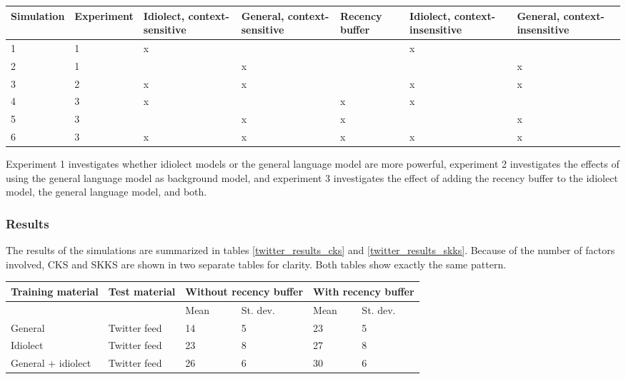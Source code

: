 \documentclass[12pt]{article}
\let\originaltable\table
\let\endoriginaltable\endtable
\renewenvironment{table}[1][ht]{%
  \originaltable[#1]
  \centering}%
  {\endoriginaltable}
\begin{document}
\begin{table}[H] \footnotesize
\begin{tabular}{l|l|p{1.2cm}p{1.2cm}p{1.2cm}p{1.2cm}p{1.2cm}} 
Simulation&Experiment&Idiolect, context-sensitive&General, context-sensitive&Recency buffer&Idiolect, context-insensitive&General, context-insensitive\\
\hline
1&1&x&&&x&\\
2&1&&x&&&x\\

3&2&x&x&&x&x\\

4&3&x&&x&x&\\
5&3&&x&x&&x\\
6&3&x&x&x&x&x\\

\end{tabular} 
\caption{Overview of all module set-ups} 
\end{table}

Experiment 1 investigates whether idiolect models or the general language model are more powerful, experiment 2 investigates the effects of using the general language model as background model, and experiment 3 investigates the effect of adding the recency buffer to the idiolect model, the general language model, and both.

\subsubsection{Results}

The results of the simulations are summarized in tables \ref{twitter_results_cks} and \ref{twitter_results_skks}. Because of the number of factors involved, CKS and SKKS are shown in two separate tables for clarity. Both tables show exactly the same pattern.

\begin{table}[H] 
\centering
\begin{tabular}{ll|llll} 
Training material&Test material&\multicolumn{2}{l}{Without recency buffer}&\multicolumn{2}{l}{With recency buffer}\\
\hline
&&Mean&St. dev.&Mean&St. dev.\\
General&Twitter feed&14&5&23&5\\
Idiolect&Twitter feed&23&8&27&8\\
General + idiolect&Twitter feed&26&6&30&6\\
\end{tabular} 
\caption{Mean percentage of keystrokes saved (\textbf{CKS}) and standard deviations for all module set-ups.} \label{twitter_results_cks}
\end{table}
\end{document}
